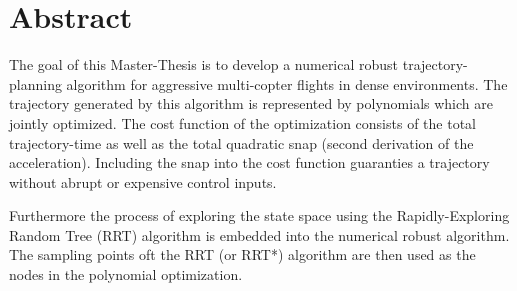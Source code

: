 




 \setcounter{tocdepth}{2}
 \tableofcontents

 \cleardoublepage







\chapter*{Abstract}

The goal of this Master-Thesis is to develop a numerical robust trajectory-planning algorithm for aggressive multi-copter flights in dense environments. The trajectory generated by this algorithm is represented by polynomials which are jointly optimized. The cost function of the optimization consists of the total trajectory-time as well as the total quadratic snap (second derivation of the acceleration). Including the snap into the cost function guaranties a trajectory without abrupt or expensive control inputs. \newline

Furthermore the process of exploring the state space using the Rapidly-Exploring Random Tree (RRT) algorithm is embedded into the numerical robust algorithm. The sampling points oft the RRT (or RRT*) algorithm are then used as the nodes in the polynomial optimization.


\newpage


